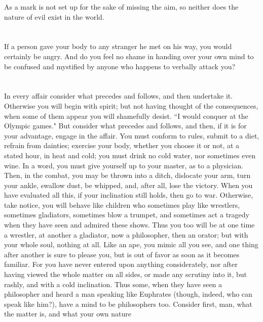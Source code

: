 \documentclass[12pt]{article}
\begin{document}
As a mark is not set up for the sake of missing the aim, so neither
does the nature of evil exist in the world. 

\section{}

If a person gave your body to any stranger he met on his way,
you would certainly be angry. And do you feel no shame in handing
over your own mind to be confused and mystified by anyone who happens
to verbally attack you? 

\section{}

In every affair consider what precedes and follows, and then undertake
it. Otherwise you will begin with spirit; but not having thought of
the consequences, when some of them appear you will shamefully desist.
``I would conquer at the Olympic games." But consider what precedes
and follows, and then, if it is for your advantage, engage in the
affair. You must conform to rules, submit to a diet, refrain from
dainties; exercise your body, whether you choose it or not, at a stated
hour, in heat and cold; you must drink no cold water, nor sometimes
even wine. In a word, you must give yourself up to your master, as
to a physician. Then, in the combat, you may be thrown into a ditch,
dislocate your arm, turn your ankle, swallow dust, be whipped, and,
after all, lose the victory. When you have evaluated all this, if
your inclination still holds, then go to war. Otherwise, take notice,
you will behave like children who sometimes play like wrestlers, sometimes
gladiators, sometimes blow a trumpet, and sometimes act a tragedy
when they have seen and admired these shows. Thus you too will be
at one time a wrestler, at another a gladiator, now a philosopher,
then an orator; but with your whole soul, nothing at all. Like an
ape, you mimic all you see, and one thing after another is sure to
please you, but is out of favor as soon as it becomes familiar. For
you have never entered upon anything considerately, nor after having
viewed the whole matter on all sides, or made any scrutiny into it,
but rashly, and with a cold inclination. Thus some, when they have
seen a philosopher and heard a man speaking like Euphrates (though,
indeed, who can speak like him?), have a mind to be philosophers too.
Consider first, man, what the matter is, and what your own nature
\end{document}
